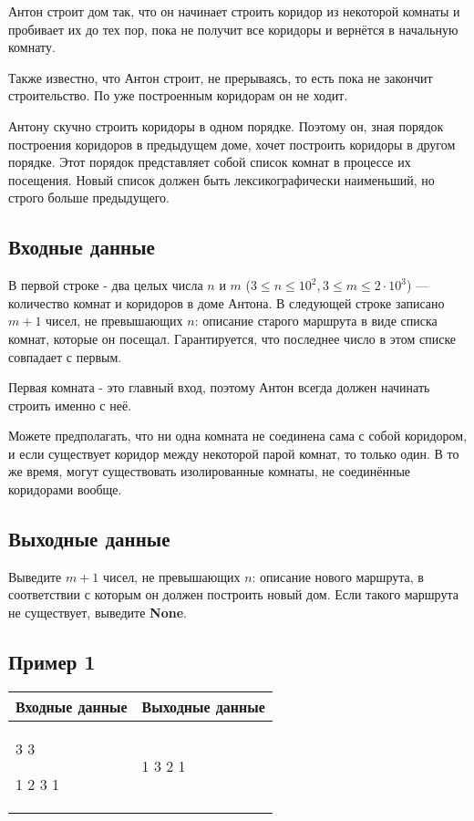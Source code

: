\documentclass{extarticle}
\begin{document}
Антон строит дом так, что он начинает строить коридор из
некоторой комнаты и пробивает их до тех пор, пока
не получит все коридоры и вернётся в начальную комнату.

Также известно, что Антон строит, не прерываясь, то есть пока не
закончит строительство. По уже построенным коридорам он не ходит.

Антону скучно строить коридоры в одном порядке. Поэтому он,
зная порядок построения коридоров в предыдущем доме, хочет
построить коридоры в другом порядке.
Этот порядок представляет собой список комнат в процессе их
посещения.
Новый список должен быть лексикографически наименьший,
но строго больше предыдущего.

\subsection*{Входные данные}
\label{sec:orge631cef}

В первой строке - два целых числа \(n\) и \(m\)
(\(3 \leq n \leq 10^{2}\), \(3 \leq m \leq 2\cdot 10^{3}\)) — количество комнат и коридоров в
доме Антона.
В следующей строке записано \(m + 1\) чисел, не превышающих \(n\):
описание старого маршрута в виде списка комнат,
которые он посещал.
Гарантируется, что последнее число в этом списке
совпадает с первым.

Первая комната - это главный вход, поэтому Антон всегда
должен начинать строить именно с неё.

Можете предполагать, что ни одна комната не соединена сама
с собой коридором, и если существует коридор между
некоторой парой комнат, то только один.
В то же время, могут существовать изолированные комнаты,
не соединённые коридорами вообще.

\subsection*{Выходные данные}
\label{sec:orgd874a15}

Выведите \(m + 1\) чисел, не превышающих \(n\):
описание нового маршрута, в соответствии с которым он должен
построить новый дом.
Если такого маршрута не существует, выведите \textbf{None}.

\subsection*{Пример 1}
\label{sec:org953b03c}

\begin{table}[H]
\begin{center}
\begin{tabular}{|m{4cm}|m{4cm}|}
\hline
Входные данные & Выходные данные \\ \hline
3 3

1 2 3 1
&
1 3 2 1
\\ \hline
\end{tabular}
\end{center}
\end{table}
\end{document}
